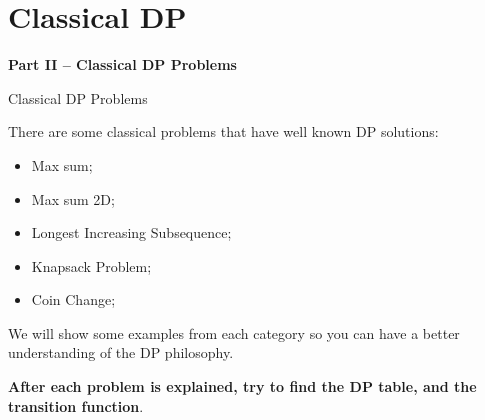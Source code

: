 




\section{Classical DP}

\begin{frame}
  \begin{center}
    {\bf Part II -- Classical DP Problems}
  \end{center}
\end{frame}

\begin{frame}{Classical DP Problems}

  There are some classical problems that have well known DP solutions:
  \bigskip

  \begin{itemize}
    \item Max sum;
    \item Max sum 2D;
    \item Longest Increasing Subsequence;
    \item Knapsack Problem;
    \item Coin Change;
  \end{itemize}
  \bigskip

  We will show some examples from each category so you can have a better understanding of the DP philosophy.\bigskip

  {\bf After each problem is explained, try to find the DP table, and the transition function}.
\end{frame}

